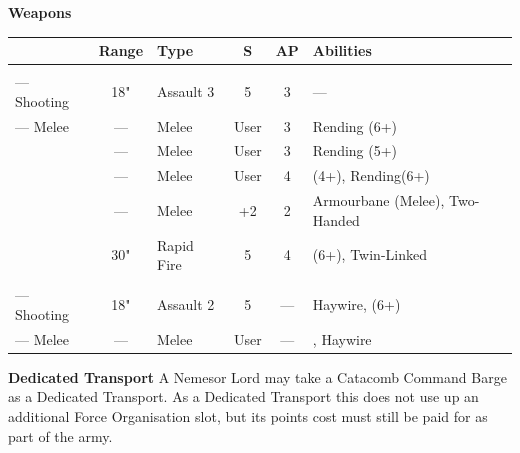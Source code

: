 \begin{minipage}[t]{0.72\textwidth}
	\vspace*{2em}
	\textbf{Weapons}
	
	\begin{tabular}{L{90 pt} c C{40pt} *{2}{c} >{\raggedright\arraybackslash}p{130pt}}
		& Range & Type & S & AP & Abilities \\
		\hline
		 & & &  &  &  \\
		— Shooting & 18" & Assault 3 & 5 & 3 & — \\
		— Melee & — & Melee & User & 3 & Rending (6+) \\
		 & — & Melee & User & 3 & Rending (5+) \\
		 & — & Melee & User & 4 &  (4+), Rending(6+) \\
		 & — & Melee & +2 & 2 & Armourbane (Melee), Two-Handed \\
		 & 30" & Rapid Fire & 5 & 4 &  (6+), Twin-Linked \\	
		 & & &  &  &  \\
		— Shooting & 18" & Assault 2 & 5 & — & Haywire,  (6+) \\
		— Melee & — & Melee & User & — & , Haywire \\
	\end{tabular}
	
	\vspace*{2em}
	\textbf{Dedicated Transport}
	A Nemesor Lord may take a Catacomb Command Barge as a Dedicated Transport. As a Dedicated Transport this does not use up an additional Force Organisation slot, but its points cost must still be paid for as part of the army.
	

\end{minipage}
